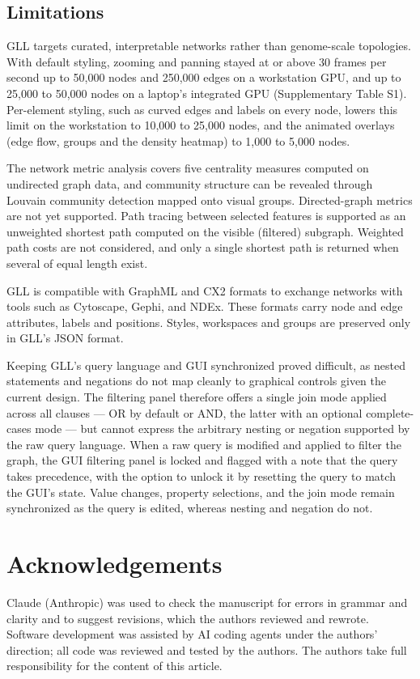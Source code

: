 \subsection{Limitations}
GLL targets curated, interpretable networks rather than genome-scale topologies.
With default styling, zooming and panning stayed at or above 30 frames per second up to 50,000 nodes and 250,000 edges on a workstation GPU, and up to 25,000 to 50,000 nodes on a laptop's integrated GPU (Supplementary Table S1). Per-element styling, such as curved edges and labels on every node, lowers this limit on the workstation to 10,000 to 25,000 nodes, and the animated overlays (edge flow, groups and the density heatmap) to 1,000 to 5,000 nodes.

The network metric analysis covers five centrality measures computed on undirected graph data, and community structure can be revealed through Louvain community detection mapped onto visual groups. Directed-graph metrics are not yet supported. Path tracing between selected features is supported as an unweighted shortest path computed on the visible (filtered) subgraph. Weighted path costs are not considered, and only a single shortest path is returned when several of equal length exist.

GLL is compatible with GraphML and CX2 formats to exchange networks with tools such as Cytoscape, Gephi, and NDEx. These formats carry node and edge attributes, labels and positions. Styles, workspaces and groups are preserved only in GLL's JSON format.

Keeping GLL's query language and GUI synchronized proved difficult, as nested statements and negations do not map cleanly to graphical controls given the current design. The filtering panel therefore offers a single join mode applied across all clauses — OR by default or AND, the latter with an optional complete-cases mode — but cannot express the arbitrary nesting or negation supported by the raw query language. When a raw query is modified and applied to filter the graph, the GUI filtering panel is locked and flagged with a note that the query takes precedence, with the option to unlock it by resetting the query to match the GUI's state. Value changes, property selections, and the join mode remain synchronized as the query is edited, whereas nesting and negation do not.

\section{Acknowledgements}
Claude (Anthropic) was used to check the manuscript for errors in grammar and clarity and to suggest revisions, which the authors reviewed and rewrote. Software development was assisted by AI coding agents under the authors' direction; all code was reviewed and tested by the authors. The authors take full responsibility for the content of this article.

